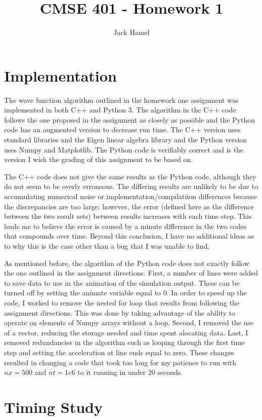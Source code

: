 \documentclass[letterpaper,11pt]{article}
\title{CMSE 401 - Homework 1}
\author{Jack Hamel}
\begin{document}
\maketitle

\section{Implementation}

The wave function algorithm outlined in the homework one assignment was implemented in both C++ and Python 3.  The algorithm in the C++ code follows the one proposed in the assignment as closely as possible and the Python code has an augmented version to decrease run time.  The C++ version uses standard libraries and the Eigen linear algebra library and the Python version uses Numpy and Matplotlib.  The Python code is verifiably correct and is the version I wish the grading of this assignment to be based on.  

The C++ code does not give the same results as the Python code, although they do not seem to be overly erroneous.  The differing results are unlikely to be due to accumulating numerical noise or implementation/compilatiion differences because the discrepancies are too large; however, the error (defined here as the difference between the two result sets) between results increases with each time step.  This leads me to believe the error is caused by a minute difference in the two codes that compounds over time.  Beyond this conclusion, I have no additional ideas as to why this is the case other than a bug that I was unable to find.  

As mentioned before, the algorithm of the Python code does not exactly follow the one outlined in the assignment directions.  First, a number of lines were added to save data to use in the animation of the simulation output.  These can be turned off by setting the animate variable equal to 0.  In order to speed up the code, I worked to remove the nested for loop that results from following the assignment directions.  This was done by taking advantage of the ability to operate on elements of Numpy arrays without a loop.  Second, I removed the use of a vector, reducing the storage needed and time spent alocating data.  Last, I removed redundancies in the algorithm such as looping through the first time step and setting the acceleration at line ends equal to zero.  These changes resulted in changing a code that took too long for my patience to run with $nx=500$ and $nt=1e6$ to it running in under 20 seconds.  
\section{Timing Study}
\end{document}
